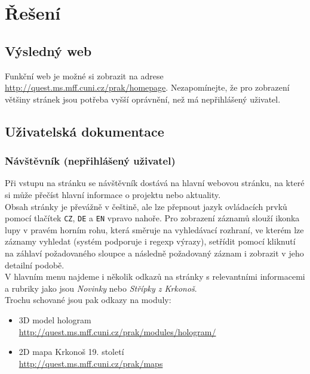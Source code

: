 \chapter{Řešení}

\section{Výsledný web}
Funkční web je možné si zobrazit na adrese \url{http://quest.ms.mff.cuni.cz/prak/homepage}.
Nezapomínejte, že pro zobrazení většiny stránek jsou potřeba vyšší oprávnění,
než má nepřihlášený uživatel.

\section{Uživatelská dokumentace}
\subsection{Návštěvník (nepřihlášený uživatel)}
Při vstupu na stránku se návštěvník dostává na hlavní webovou stránku,
na které si může přečíst hlavní informace o projektu nebo aktuality.\\
Obsah stránky je převážně v češtině, ale lze přepnout jazyk ovládacích prvků
pomocí tlačítek \texttt{CZ}, \texttt{DE} a \texttt{EN} vpravo nahoře.
Pro zobrazení záznamů slouží ikonka lupy v pravém horním rohu, která směruje na
vyhledávací rozhraní, ve kterém lze záznamy vyhledat (systém podporuje i regexp výrazy),
setřídit pomocí kliknutí na záhlaví požadovaného sloupce a následně požadovaný záznam i 
zobrazit v jeho detailní podobě.\\
V hlavním menu najdeme i několik odkazů na stránky s relevantními informacemi a
rubriky jako jsou \textit{Novinky} nebo \textit{Střípky z Krkonoš}.\\
Trochu schované jsou pak odkazy na moduly:
\begin{itemize}
	\item 3D model hologram \\
		\url{http://quest.ms.mff.cuni.cz/prak/modules/hologram/}
	\item 2D mapa Krkonoš 19. století \\
		\url{http://quest.ms.mff.cuni.cz/prak/maps}
\end{itemize}

